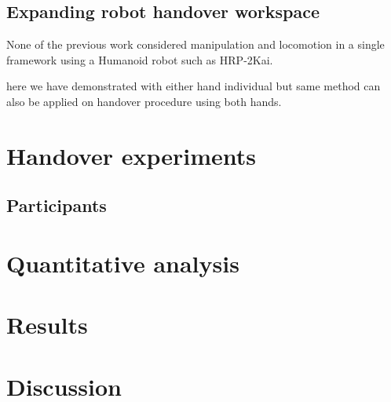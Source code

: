 \documentclass[a4paper, 12pt, oneside]{Thesis}  %
\begin{document}
\subsection{Expanding robot handover workspace}

None of the previous work considered manipulation and locomotion in a single framework using a Humanoid robot such as HRP-2Kai.

here we have demonstrated with either hand individual but same method can also be applied on handover procedure using both hands.


\clearpage

\section{Handover experiments}

\subsection{Participants}



\clearpage

\section{Quantitative analysis}



\clearpage

\section{Results}



\clearpage

\section{Discussion}




\end{document}
